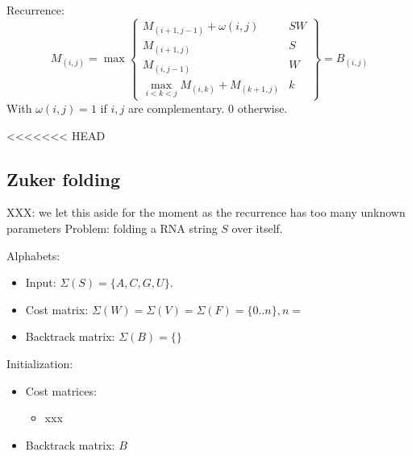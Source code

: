 \documentclass[11pt]{article}
\def\ul{\begin{itemize}}
\def\ule{\end{itemize}}
\begin{document}
Recurrence:
\[M_{(i,j)}=\max\left\{\begin{array}{l|l}
	M_{(i+1,j-1)}+\omega(i,j) & SW\\
	M_{(i+1,j)} & S\\
	M_{(i,j-1)} & W\\
	\max_{i<k<j}M_{(i,k)}+M_{(k+1,j)} & k
\end{array}\right\} = B_{(i,j)} \]
With $\omega(i,j)=1$ if $i,j$ are complementary. 0 otherwise.

<<<<<<< HEAD
\newpage
\subsection{Zuker folding}
XXX: we let this aside for the moment as the recurrence has too many unknown parameters
Problem: folding a RNA string $S$ over itself.

Alphabets:\ul
\item Input: $\Sigma(S)=\{A,C,G,U\}$.
\item Cost matrix: $\Sigma(W)=\Sigma(V)=\Sigma(F)=\{0..n\},n=$
\item Backtrack matrix: $\Sigma(B)=\{\}$
\ule

Initialization:\ul
\item Cost matrices:\ul
	\item xxx
\ule
\item Backtrack matrix: $B$
\ule
\end{document}
